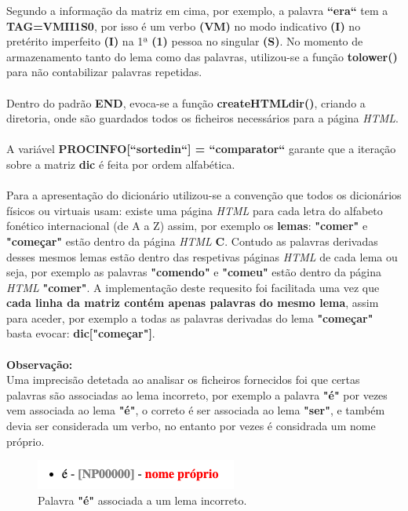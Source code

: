 \documentclass[11pt,a4paper]{report}%
\begin{document}
Segundo a informação da matriz em cima, por exemplo, a palavra \textbf{``era``} tem a \textbf{TAG=VMII1S0}, por isso é um verbo \textbf{(VM)} no modo indicativo \textbf{(I)} no pretérito imperfeito \textbf{(I)} na 1ª \textbf{(1)} pessoa no singular \textbf{(S)}. No momento de armazenamento tanto do lema como das palavras, utilizou-se a função \textbf{tolower()} para não contabilizar palavras repetidas. 
\\\\
Dentro do padrão \textbf{END}, evoca-se a função \textbf{createHTMLdir()}, criando a diretoria, onde são guardados todos os ficheiros necessários para a página \emph{HTML}. 
\\\\
A variável \textbf{PROCINFO[``sorted\textunderscore in``] = ``comparator``} garante que a iteração sobre a matriz \textbf{dic} é feita por ordem alfabética. 
\\\\
Para a apresentação do dicionário utilizou-se a convenção que todos os dicionários físicos ou virtuais usam: existe uma página \emph{HTML} para cada letra do alfabeto fonético internacional (de A a Z) assim, por exemplo os \textbf{lemas}: \textbf{"comer"} e \textbf{"começar"} estão dentro da página \emph{HTML} \textbf{C}. Contudo as palavras derivadas desses mesmos lemas estão dentro das respetivas páginas \emph{HTML} de cada lema ou seja, por exemplo as palavras \textbf{"comendo"} e \textbf{"comeu"} estão dentro da página \emph{HTML} \textbf{"comer"}. A implementação deste requesito foi facilitada uma vez que \textbf{cada linha da matriz contém apenas palavras do mesmo lema}, assim para aceder, por exemplo a todas as palavras derivadas do lema \textbf{"começar"} basta evocar: \textbf{dic["começar"]}.
\\\\
\textbf{Observação:}
\\
Uma imprecisão detetada ao analisar os ficheiros fornecidos foi que certas palavras são associadas ao lema incorreto, por exemplo a palavra  \textbf{"é"} por vezes vem associada ao lema \textbf{"é"}, o correto é ser associada ao lema \textbf{"ser"}, e também devia ser considerada um verbo, no entanto por vezes é considrada um nome próprio. 

\begin{figure}[H]
	\centering
	\includegraphics[scale=0.6]{e.png}
	\caption{Palavra \textbf{"é"} associada a um lema incorreto. }
	\label{img:pag}
\end{figure}
\end{document}
